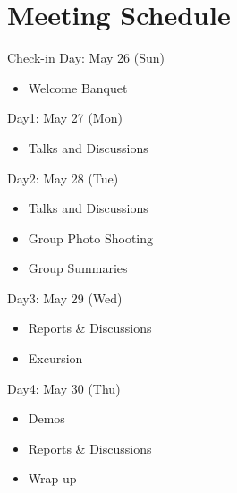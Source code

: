 \documentclass[a4paper]{article}
\begin{document}
\clearpage

\section*{Meeting Schedule}
\begin{bfseries}
Check-in Day: May 26 (Sun)
\end{bfseries}
\begin{itemize}
\item Welcome Banquet
\end{itemize}
\begin{bfseries}
{Day1: May 27 (Mon)}
\end{bfseries}
\begin{itemize}
\item Talks and Discussions
\end{itemize}
\begin{bfseries}
Day2: May 28 (Tue)
\end{bfseries}
\begin{itemize}
\item Talks and Discussions
\item Group Photo Shooting
\item Group Summaries
\end{itemize}
\begin{bfseries}
Day3: May 29 (Wed)
\end{bfseries}
\begin{itemize}
\item Reports \& Discussions
\item Excursion
\end{itemize}
\begin{bfseries}
Day4: May 30 (Thu)
\end{bfseries}
\begin{itemize}
\item Demos
\item Reports \& Discussions
\item Wrap up
\end{itemize}
\end{document}
